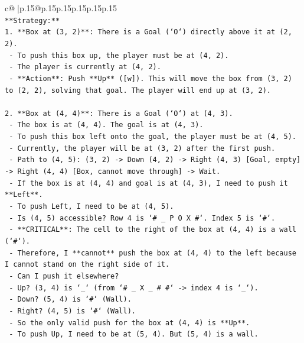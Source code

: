 \documentclass{article}
\begin{document}
{\begin{supertabular}{c@{$\;$}|p{.15\linewidth}@{}p{.15\linewidth}p{.15\linewidth}p{.15\linewidth}p{.15\linewidth}p{.15\linewidth}}
{{{\\ 
\texttt{**Strategy:**} \\
\texttt{1. **Box at (3, 2)**: There is a Goal (`O`) directly above it at (2, 2).} \\
\texttt{   {-} To push this box up, the player must be at (4, 2).} \\
\texttt{   {-} The player is currently at (4, 2).} \\
\texttt{   {-} **Action**: Push **Up** ({[}w{]}). This will move the box from (3, 2) to (2, 2), solving that goal. The player will end up at (3, 2).} \\
\\ 
\texttt{2. **Box at (4, 4)**: There is a Goal (`O`) at (4, 3).} \\
\texttt{   {-} The box is at (4, 4). The goal is at (4, 3).} \\
\texttt{   {-} To push this box left onto the goal, the player must be at (4, 5).} \\
\texttt{   {-} Currently, the player will be at (3, 2) after the first push.} \\
\texttt{   {-} Path to (4, 5): (3, 2) {-}> Down (4, 2) {-}> Right (4, 3) {[}Goal, empty{]} {-}> Right (4, 4) {[}Box, cannot move through{]} {-}> Wait.} \\
\texttt{   {-} If the box is at (4, 4) and goal is at (4, 3), I need to push it **Left**.} \\
\texttt{   {-} To push Left, I need to be at (4, 5).} \\
\texttt{   {-} Is (4, 5) accessible? Row 4 is `\# \_ P O X \#`. Index 5 is `\#`.} \\
\texttt{   {-} **CRITICAL**: The cell to the right of the box at (4, 4) is a wall (`\#`).} \\
\texttt{   {-} Therefore, I **cannot** push the box at (4, 4) to the left because I cannot stand on the right side of it.} \\
\texttt{   {-} Can I push it elsewhere?} \\
\texttt{     {-} Up? (3, 4) is `\_` (from `\# \_ X \_ \# \#` {-}> index 4 is `\_`).} \\
\texttt{     {-} Down? (5, 4) is `\#` (Wall).} \\
\texttt{     {-} Right? (4, 5) is `\#` (Wall).} \\
\texttt{   {-} So the only valid push for the box at (4, 4) is **Up**.} \\
\texttt{   {-} To push Up, I need to be at (5, 4). But (5, 4) is a wall.} \\
}}}
\end{supertabular}}
\end{document}
